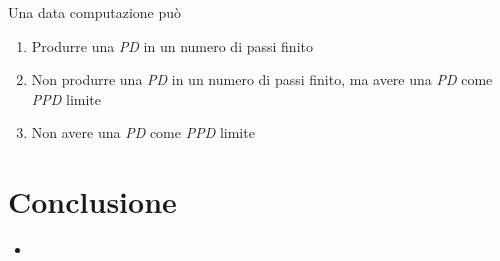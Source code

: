 \documentclass{beamer}
\begin{document}
\begin{frame}{\subsecname}{}
	Una data computazione può
	\begin{enumerate}
		\item Produrre una \textit{PD} in un numero di passi finito
		\item Non produrre una \textit{PD} in un numero di passi finito, ma avere una \textit{PD} come \textit{PPD} limite
		\item Non avere una \textit{PD} come \textit{PPD} limite
	\end{enumerate}
\end{frame}

\section{Conclusione}

\begin{frame}{\secname}{}
	\begin{itemize}
		\item
	\end{itemize}
\end{frame}
\end{document}
